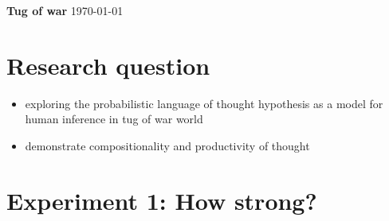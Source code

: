 \documentclass[11pt]{article}
\begin{document}
\begin{center} 
{\LARGE \textbf{Tug of war}}
\linebreak
\linebreak
\today
\end{center} 

\tableofcontents 

\clearpage 

\section{Research question}
\label{sec:research_question}

\begin{itemize}
	\item exploring the probabilistic language of thought hypothesis as a model for human inference in tug of war world
	\item demonstrate compositionality and productivity of thought 
\end{itemize}

\section{Experiment 1: How strong?}
\label{sec:experiment_1_how_strong}
\end{document}
